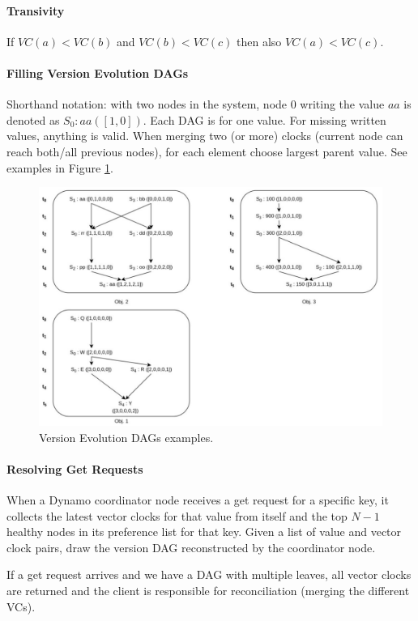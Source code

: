 \paragraph{Transivity}
If $VC(a) < VC(b)$ and $VC(b) < VC(c)$ then also $VC(a) < VC(c)$.

\paragraph{Filling Version Evolution DAGs}
Shorthand notation: with two nodes in the system, node 0 writing the value $aa$ is denoted as $S_0: aa ([1, 0])$. Each DAG is for one value. For missing written values, anything is valid. When merging two (or more) clocks (current node can reach both/all previous nodes), for each element choose largest parent value. See examples in Figure \ref{fig:vc_ex}.

\begin{figure}[h]
	\centering
	\includegraphics[scale=0.3]{images/6-vs_ex.png}
	\caption{Version Evolution DAGs examples.}
	\label{fig:vc_ex}
\end{figure}

\paragraph{Resolving Get Requests}
When a Dynamo coordinator node receives a get request for a specific key, it collects the latest vector clocks for that value from itself and the top $N-1$ healthy nodes in its preference list for that key. Given a list of value and vector clock pairs, draw the version DAG reconstructed by the coordinator node.

If a get request arrives and we have a DAG with multiple leaves, all vector clocks are returned and the client is responsible for reconciliation (merging the different VCs).

